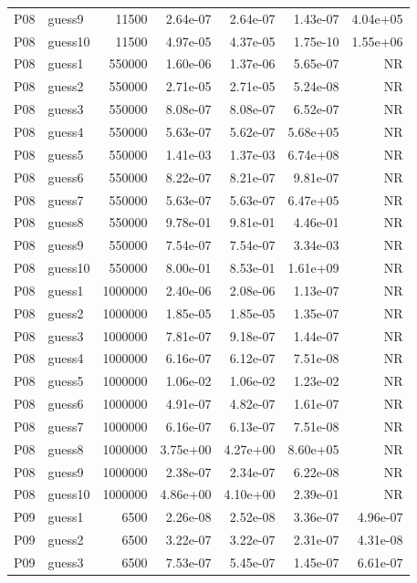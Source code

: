 {\begin{longtable}{llrrrrr}
P08 & guess9 & 11500 & 2.64e-07 & 2.64e-07 & 1.43e-07 & 4.04e+05 \\
P08 & guess10 & 11500 & 4.97e-05 & 4.37e-05 & 1.75e-10 & 1.55e+06 \\
P08 & guess1 & 550000 & 1.60e-06 & 1.37e-06 & 5.65e-07 & NR \\
P08 & guess2 & 550000 & 2.71e-05 & 2.71e-05 & 5.24e-08 & NR \\
P08 & guess3 & 550000 & 8.08e-07 & 8.08e-07 & 6.52e-07 & NR \\
P08 & guess4 & 550000 & 5.63e-07 & 5.62e-07 & 5.68e+05 & NR \\
P08 & guess5 & 550000 & 1.41e-03 & 1.37e-03 & 6.74e+08 & NR \\
P08 & guess6 & 550000 & 8.22e-07 & 8.21e-07 & 9.81e-07 & NR \\
P08 & guess7 & 550000 & 5.63e-07 & 5.63e-07 & 6.47e+05 & NR \\
P08 & guess8 & 550000 & 9.78e-01 & 9.81e-01 & 4.46e-01 & NR \\
P08 & guess9 & 550000 & 7.54e-07 & 7.54e-07 & 3.34e-03 & NR \\
P08 & guess10 & 550000 & 8.00e-01 & 8.53e-01 & 1.61e+09 & NR \\
P08 & guess1 & 1000000 & 2.40e-06 & 2.08e-06 & 1.13e-07 & NR \\
P08 & guess2 & 1000000 & 1.85e-05 & 1.85e-05 & 1.35e-07 & NR \\
P08 & guess3 & 1000000 & 7.81e-07 & 9.18e-07 & 1.44e-07 & NR \\
P08 & guess4 & 1000000 & 6.16e-07 & 6.12e-07 & 7.51e-08 & NR \\
P08 & guess5 & 1000000 & 1.06e-02 & 1.06e-02 & 1.23e-02 & NR \\
P08 & guess6 & 1000000 & 4.91e-07 & 4.82e-07 & 1.61e-07 & NR \\
P08 & guess7 & 1000000 & 6.16e-07 & 6.13e-07 & 7.51e-08 & NR \\
P08 & guess8 & 1000000 & 3.75e+00 & 4.27e+00 & 8.60e+05 & NR \\
P08 & guess9 & 1000000 & 2.38e-07 & 2.34e-07 & 6.22e-08 & NR \\
P08 & guess10 & 1000000 & 4.86e+00 & 4.10e+00 & 2.39e-01 & NR \\
P09 & guess1 & 6500 & 2.26e-08 & 2.52e-08 & 3.36e-07 & 4.96e-07 \\
P09 & guess2 & 6500 & 3.22e-07 & 3.22e-07 & 2.31e-07 & 4.31e-08 \\
P09 & guess3 & 6500 & 7.53e-07 & 5.45e-07 & 1.45e-07 & 6.61e-07 \\

\end{longtable}}
